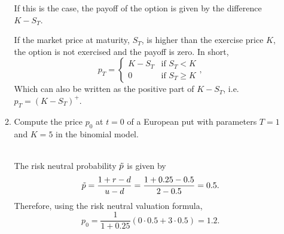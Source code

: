 \documentclass[handout,8pt]{beamer}
\begin{document}
\begin{frame}[allowframebreaks]{ }
\begin{enumerate}
\begin{enumerate}
        If this is the case, the payoff of the option is given by the difference $K-S_T$. \newline
        
        If the market price at maturity, $S_T$, is higher than the exercise price $K$, the option is not exercised and the payoff is zero. In short,
        \begin{equation*}
            p_T=    \begin{cases}
                        K-S_T   & \text{if $S_T < K$} \\
                        0       & \text{if $S_T \geq K$}
                    \end{cases},       
        \end{equation*}
        Which can also be written as the positive part of $K-S_T$, i.e. $p_T=(K-S_T)^+$.
        
\newpage
        \item Compute the price $p_0$ at $t=0$ of a European put with parameters $T=1$ and $K=5$ in the binomial model.
        \begin{figure}[hp]
        \end{figure}\\
        The risk neutral probability $\Tilde{p}$ is given by
        \begin{equation*}
            \Tilde{p} = \frac{1+r-d}{u-d} = \frac{1+0.25-0.5}{2-0.5} = 0.5.
        \end{equation*}
        Therefore, using the risk neutral valuation formula,
        \begin{equation*}
            p_0 = \frac{1}{1+0.25}(0\cdot 0.5 + 3\cdot 0.5)=1.2.
        \end{equation*}
        

\end{enumerate}
\end{enumerate}
\end{frame}
\end{document}
